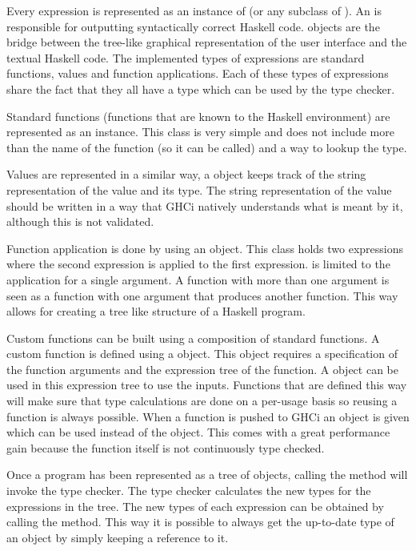 Every expression is represented as an instance of  (or any subclass of ). 
An  is responsible for outputting syntactically correct Haskell code.  objects are the bridge between the tree-like graphical representation of the user interface and the textual Haskell code.
The implemented types of expressions are standard functions, values and function applications.
Each of these types of expressions share the fact that they all have a type which can be used by the type checker.

Standard functions (functions that are known to the Haskell environment) are represented as an  instance. 
This class is very simple and does not include more than the name of the function (so it can be called) and a way to lookup the type.

Values are represented in a similar way, a  object keeps track of the string representation of the value and its type. 
The string representation of the value should be written in a way that GHCi natively understands what is meant by it, although this is not validated.

Function application is done by using an  object. 
This class holds two expressions where the second expression is applied to the first expression.
 is limited to the application for a single argument.
A function with more than one argument is seen as a function with one argument that produces another function.
This way  allows for creating a tree like structure of a Haskell program.

Custom functions can be built using a composition of standard functions.
A custom function is defined using a  object.
This object requires a specification of the function arguments and the expression tree of the function.
A  object can be used in this expression tree to use the inputs.
Functions that are defined this way will make sure that type calculations are done on a per-usage basis so reusing a function is always possible.
When a function is pushed to GHCi an  object is given which can be used instead of the  object.
This comes with a great performance gain because the function itself is not continuously type checked.

Once a program has been represented as a tree of  objects, calling the  method will invoke the type checker.
The type checker calculates the new types for the expressions in the tree.
The new types of each expression can be obtained by calling the  method.
This way it is possible to always get the up-to-date type of an  object by simply keeping a reference to it.

